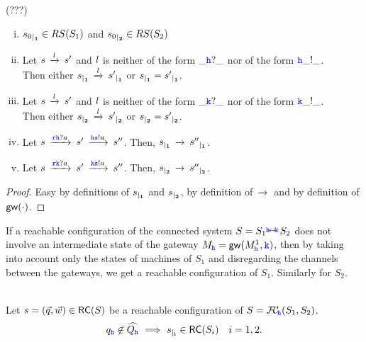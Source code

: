 \begin{lemma} (???) \hfill
\label{lem:indrestrict}  
\begin{enumerate}[i)]
\item
\label{lem:indrestrict-a}
$\restrict{s_0}{1}\in RS(S_1)$ and  $\restrict{s_0}{2}\in RS(S_2)$
\item
Let $s\lts{\elle}s'$ 
and $\elle$ is neither of the form $\_\HH?\_$ nor of the form $\HH\_!\_$.\\
Then either $\restrict{s}{1}\lts{\elle}\restrict{s'}{1}$ or  $\restrict{s}{1}=\restrict{s'}{1}$.
\item
Let $s\lts{\elle}s'$ 
and $\elle$ is neither of the form $\_\KK?\_$ nor of the form $\KK\_!\_$.\\
Then either $\restrict{s}{2}\lts{\elle}\restrict{s'}{2}$ or  $\restrict{s}{2}=\restrict{s'}{2}$.
\item
Let $s\lts{\ttr\HH?a} s'\lts{\HH\tts!a} s''$.
Then, $\restrict{s}{1}\lts{}\restrict{s''}{1}$.
\item
Let $s\lts{\ttr\KK?a} s'\lts{\KK\tts!a} s''$.
Then, $\restrict{s}{2}\lts{}\restrict{s''}{2}$.
\end{enumerate}
\end{lemma}

\begin{proof}
Easy by definitions of $\restrict{s}{1}$ and $\restrict{s}{2}$, by definition of $\lts{}$ and by definition of 
$\gateway{\cdot}$.
\end{proof}



If a reachable configuration of the connected system $S={S_{1}}\connect{\HH}{\KK} {S_{2}}$ does not involve an intermediate state of the gateway
$M_\HH = \gateway{M^1_\HH, \KK}$, %
then by taking into account only the states of machines of $S_1$ and disregarding
the channels between the gateways, %
we get a
reachable configuration of $S_1$. Similarly for $S_2$.

\begin{lemma}
\label{lem:nohatrestrict}\hfill\\
Let $s= (\vec{q},\vec{w}) \in \RS(S)$ be a reachable configuration of 
$S =\fusioncomp_{\!\hh}(S_1,S_2)$.
$${q}_\HH\not\in\widehat{Q_\hh} \implies 
\restrict{s}{i}\in \RS(S_i) \quad i=1,2.$$
\end{lemma}

